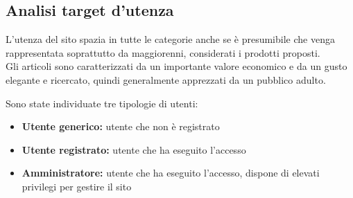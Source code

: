 \documentclass[a4paper, 11pt]{article}
\begin{document}
\subsection{Analisi target d'utenza}\label{analisi_utenza}
L’utenza del sito spazia in tutte le categorie anche se è presumibile che venga rappresentata soprattutto da maggiorenni, considerati i prodotti proposti. \\
Gli articoli sono caratterizzati da un importante valore economico e da un gusto elegante e ricercato, quindi generalmente apprezzati da un pubblico adulto.
\vspace{10pt}

Sono state individuate tre tipologie di utenti:
\begin{itemize}
\item \textbf{Utente generico:} utente che non è registrato
\item \textbf{Utente registrato:} utente che ha eseguito l'accesso
\item \textbf{Amministratore:} utente che ha eseguito l'accesso, dispone di elevati privilegi per gestire il sito
\end{itemize}
\end{document}
